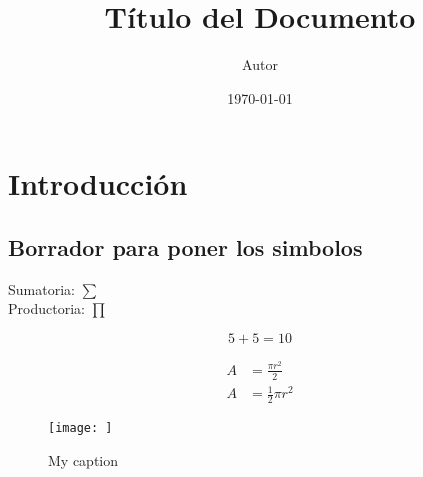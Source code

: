\documentclass{article}
\title{Título del Documento}
\author{Autor}
\date{\today}
\begin{document}
\maketitle

\section{Introducción}
\subsection{Borrador para poner los simbolos}
Sumatoria: $\sum$ \\
Productoria: $\prod$

\begin{equation}
    5 + 5 = 10
\end{equation}

\begin{equation} \label{eq1}
    \begin{split}
        A & = \frac{\pi r^2}{2} \\
        A & = \frac{1}{2} \pi r^2
    \end{split}
\end{equation}

\begin{figure}[H]
    \centering
    \texttt{[image: ]}
    \caption{My caption}
    \label{fig:my_label}
\end{figure}
\end{document}
